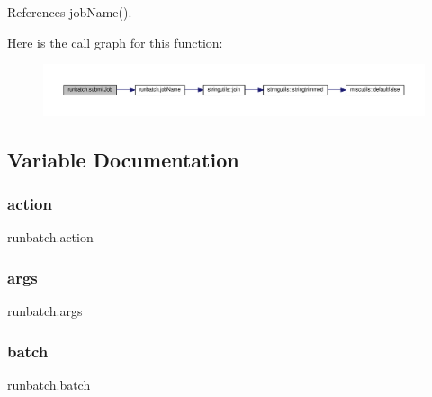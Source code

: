 References job\+Name().

Here is the call graph for this function\+:
\nopagebreak
\begin{figure}[H]
\begin{center}
\leavevmode
\includegraphics[width=350pt]{namespacerunbatch_a83ac3b0265b97b5bf1251f0041ada563_cgraph}
\end{center}
\end{figure}


\subsection{Variable Documentation}
\mbox{\label{namespacerunbatch_a317dc1ef96a133f49e42244541d7a15d}} 
\subsubsection{\texorpdfstring{action}{action}}
{\footnotesize\ttfamily runbatch.\+action}

\mbox{\label{namespacerunbatch_adec503d1c28d65e15089a63b97249a7d}} 
\subsubsection{\texorpdfstring{args}{args}}
{\footnotesize\ttfamily runbatch.\+args}

\mbox{\label{namespacerunbatch_a61d01d0887dc9d18c4d043b0bfff42e0}} 
\subsubsection{\texorpdfstring{batch}{batch}}
{\footnotesize\ttfamily runbatch.\+batch}

\mbox{\label{namespacerunbatch_ad6bbef4ac29a023780e12007cf2eef6e}} 
